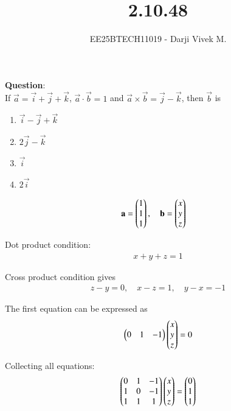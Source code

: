 \documentclass[journal]{IEEEtran}
\begin{document}


\title{2.10.48}
\author{EE25BTECH11019 - Darji Vivek M.}
{\let\newpage\relax\maketitle}

\renewcommand{\thefigure}{\theenumi}
\renewcommand{\thetable}{\theenumi}
\setlength{\intextsep}{10pt}
\renewcommand{\thetable}{\theenumi}

\textbf{Question}:\\
If $\vec{a} = \vec{i}+\vec{j}+\vec{k}$, $\vec{a}\cdot\vec{b}=1$ and $\vec{a}\times\vec{b}=\vec{j}-\vec{k}$, then $\vec{b}$ is  

\begin{multicols}{2}
\begin{enumerate}[label=(\alph*)]
\item $\vec{i}-\vec{j}+\vec{k}$  
\item $2\vec{j}-\vec{k}$  
\item $\vec{i}$  
\item $2\vec{i}$  
\end{enumerate}
\end{multicols}  

\solution  

\begin{align}
\mathbf{a} &= \begin{pmatrix}1\\1\\1\end{pmatrix}, \quad 
\mathbf{b} = \begin{pmatrix}x\\y\\z\end{pmatrix}
\end{align}

Dot product condition:
\begin{align}
x+y+z=1
\end{align}

Cross product condition gives
\begin{align}
z-y=0,\quad x-z=1,\quad y-x=-1
\end{align}

The first equation can be expressed as
\begin{align}
\begin{pmatrix}0 & 1 & -1\end{pmatrix}\begin{pmatrix}x\\y\\z\end{pmatrix}=0
\end{align}

Collecting all equations:
\begin{align}
\begin{pmatrix}0 & 1 & -1\\ 1 & 0 & -1\\ 1 & 1 & 1\end{pmatrix}\begin{pmatrix}x\\y\\z\end{pmatrix}=\begin{pmatrix}0\\1\\1\end{pmatrix}
\end{align}
\end{document}

